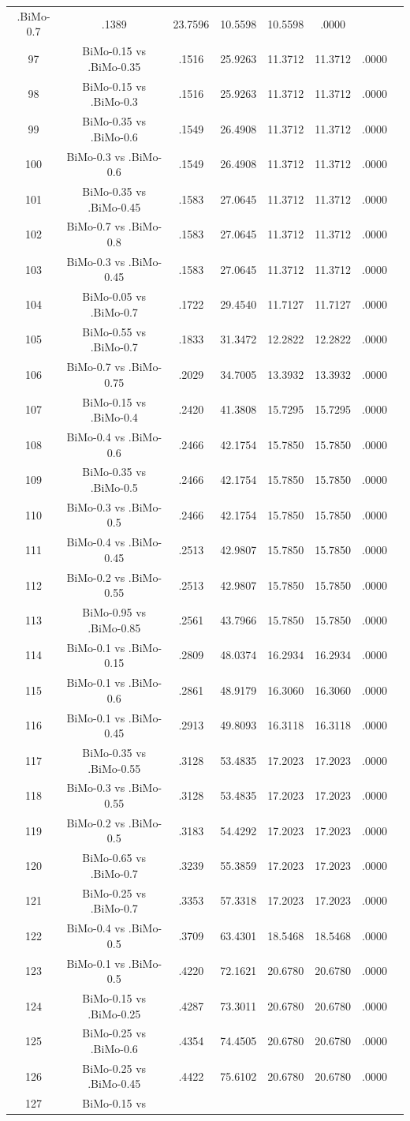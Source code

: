 \documentclass[a4paper,10pt]{article}
\begin{document}
\begin{landscape}
\begin{table}[!htp]
\begin{tabular}{cccccccc}
.BiMo-0.7&.1389&23.7596&10.5598&10.5598&.0000\\97&BiMo-0.15 vs .BiMo-0.35&.1516&25.9263&11.3712&11.3712&.0000\\98&BiMo-0.15 vs .BiMo-0.3&.1516&25.9263&11.3712&11.3712&.0000\\99&BiMo-0.35 vs .BiMo-0.6&.1549&26.4908&11.3712&11.3712&.0000\\100&BiMo-0.3 vs .BiMo-0.6&.1549&26.4908&11.3712&11.3712&.0000\\101&BiMo-0.35 vs .BiMo-0.45&.1583&27.0645&11.3712&11.3712&.0000\\102&BiMo-0.7 vs .BiMo-0.8&.1583&27.0645&11.3712&11.3712&.0000\\103&BiMo-0.3 vs .BiMo-0.45&.1583&27.0645&11.3712&11.3712&.0000\\104&BiMo-0.05 vs .BiMo-0.7&.1722&29.4540&11.7127&11.7127&.0000\\105&BiMo-0.55 vs .BiMo-0.7&.1833&31.3472&12.2822&12.2822&.0000\\106&BiMo-0.7 vs .BiMo-0.75&.2029&34.7005&13.3932&13.3932&.0000\\107&BiMo-0.15 vs .BiMo-0.4&.2420&41.3808&15.7295&15.7295&.0000\\108&BiMo-0.4 vs .BiMo-0.6&.2466&42.1754&15.7850&15.7850&.0000\\109&BiMo-0.35 vs .BiMo-0.5&.2466&42.1754&15.7850&15.7850&.0000\\110&BiMo-0.3 vs .BiMo-0.5&.2466&42.1754&15.7850&15.7850&.0000\\111&BiMo-0.4 vs .BiMo-0.45&.2513&42.9807&15.7850&15.7850&.0000\\112&BiMo-0.2 vs .BiMo-0.55&.2513&42.9807&15.7850&15.7850&.0000\\113&BiMo-0.95 vs .BiMo-0.85&.2561&43.7966&15.7850&15.7850&.0000\\114&BiMo-0.1 vs .BiMo-0.15&.2809&48.0374&16.2934&16.2934&.0000\\115&BiMo-0.1 vs .BiMo-0.6&.2861&48.9179&16.3060&16.3060&.0000\\116&BiMo-0.1 vs .BiMo-0.45&.2913&49.8093&16.3118&16.3118&.0000\\117&BiMo-0.35 vs .BiMo-0.55&.3128&53.4835&17.2023&17.2023&.0000\\118&BiMo-0.3 vs .BiMo-0.55&.3128&53.4835&17.2023&17.2023&.0000\\119&BiMo-0.2 vs .BiMo-0.5&.3183&54.4292&17.2023&17.2023&.0000\\120&BiMo-0.65 vs .BiMo-0.7&.3239&55.3859&17.2023&17.2023&.0000\\121&BiMo-0.25 vs .BiMo-0.7&.3353&57.3318&17.2023&17.2023&.0000\\122&BiMo-0.4 vs .BiMo-0.5&.3709&63.4301&18.5468&18.5468&.0000\\123&BiMo-0.1 vs .BiMo-0.5&.4220&72.1621&20.6780&20.6780&.0000\\124&BiMo-0.15 vs .BiMo-0.25&.4287&73.3011&20.6780&20.6780&.0000\\125&BiMo-0.25 vs .BiMo-0.6&.4354&74.4505&20.6780&20.6780&.0000\\126&BiMo-0.25 vs .BiMo-0.45&.4422&75.6102&20.6780&20.6780&.0000\\127&BiMo-0.15 vs 
\end{tabular}
\end{table}
\end{landscape}
\end{document}
